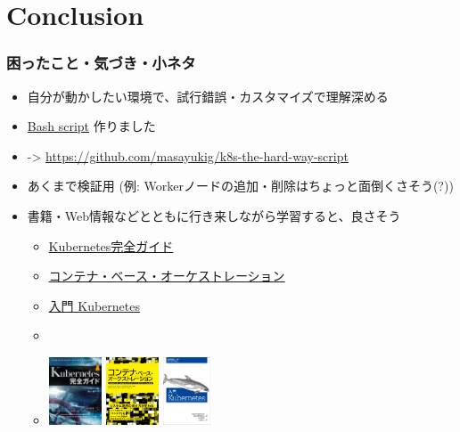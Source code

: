 \documentclass[aspectratio=169,11pt,hyperref={colorlinks=true}]{beamer}
\begin{document}
\section{Conclusion}
\begin{frame}
  \frametitle{困ったこと・気づき・小ネタ}
  \begin{itemize}
    \item 自分が動かしたい環境で、試行錯誤・カスタマイズで理解深める
    \item \href{https://github.com/masayukig/k8s-the-hard-way-script}{Bash script} 作りました
    \item[] -> \url{https://github.com/masayukig/k8s-the-hard-way-script}
    \item あくまで検証用 (例: Workerノードの追加・削除はちょっと面倒くさそう(?))
    \item 書籍・Web情報などとともに行き来しながら学習すると、良さそう
    \begin{itemize}
      \item
      \href{https://book.impress.co.jp/books/1118101055}{Kubernetes完全ガイド}
      \item
      \href{https://www.shoeisha.co.jp/book/detail/9784798155371}{コンテナ・ベース・オーケストレーション}
      \item
      \href{https://www.oreilly.co.jp/books/9784873118406/}{入門 Kubernetes}
      \item[]
      \item[] \includegraphics[height=20mm]{images/kubernetes_complete_guide.jpg}
       \includegraphics[height=20mm]{images/container_based_orchestration.jpg}
       \includegraphics[height=20mm]{images/kubernetes_up_and_running.jpeg}
    \end{itemize}
  \end{itemize}
\end{frame}
\end{document}
